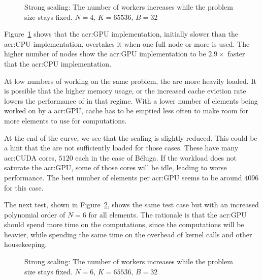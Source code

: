 \begin{figure}[H]
    \centering
    
    \caption{Strong scaling: The number of workers increases while the problem size stays fixed. \(N
        = 4\), \(K = 65536\), \(B = 32\)}\label{fig:strong_scaling_N4_W32}
\end{figure}

Figure~\ref{fig:strong_scaling_N4_W32} shows that the \acrshort{acr:GPU} implementation, initially
slower than the \acrshort{acr:CPU} implementation, overtakes it when one full node or more is used.
The higher number of nodes show the \acrshort{acr:GPU} implementation to be \(2.9 \times \) faster
that the \acrshort{acr:CPU} implementation.

At low numbers of  working on the same problem, the  are
more heavily loaded. It is possible that the higher memory usage, or the increased cache eviction
rate lowers the performance of  in that regime. With a lower number of elements
being worked on by a \acrshort{acr:GPU}, cache has to be emptied less often to make room for more
elements to use for computations.

At the end of the curve, we see that the scaling is slightly reduced. This could be a hint that the
 are not sufficiently loaded for those cases. These  have
many \acrshort{acr:CUDA} cores, \(5120\) each in the case of Béluga. If the workload does not saturate
the \acrshort{acr:GPU}, some of those cores will be idle, leading to worse performance. The best
number of elements per \acrshort{acr:GPU} seems to be around \(4096\) for this case.

The next test, shown in Figure~\ref{fig:strong_scaling_N6_W32}, shows the same test case but with an
increased polynomial order of \(N = 6\) for all elements. The rationale is that the
\acrshort{acr:GPU} should spend more time on the computations, since the computations will be
heavier, while spending the same time on the overhead of kernel calls and other housekeeping.

\begin{figure}[H]
    \centering
    
    \caption{Strong scaling: The number of workers increases while the problem size stays fixed. \(N
        = 6\), \(K = 65536\), \(B = 32\)}\label{fig:strong_scaling_N6_W32}
\end{figure}

